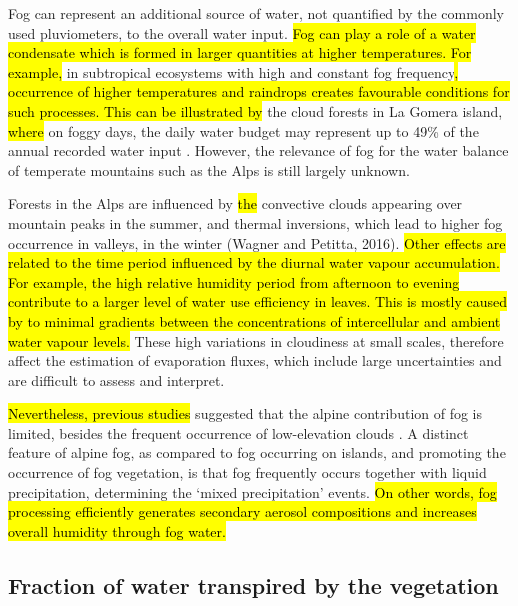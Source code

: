 \documentclass[10pt,letterpaper]{article}
\begin{document}
Fog can represent an additional source of water, not quantified by the commonly used pluviometers, to the overall water input. \hl{Fog can play a role of a water condensate which is formed in larger quantities at higher temperatures. For example, }in subtropical ecosystems with high and constant fog frequency\hl{, occurrence of higher temperatures and raindrops creates favourable conditions for such processes. This can be illustrated by }the cloud forests in La Gomera island, \hl{where }on foggy days, the daily water budget may represent up to 49\% of the annual recorded water input \cite{e16b77c7c83b4b92b69d38a25a041d1a,GARCIASANTOS20091565,SantosBruijnzeel2011}. However, the relevance of fog for the water balance of temperate mountains such as the Alps is still largely unknown. 

Forests in the Alps are influenced by \hl{the} convective clouds appearing over mountain peaks in the summer, and thermal inversions, which lead to higher fog occurrence in valleys, in the winter (Wagner and Petitta, 2016). \hl{Other effects are related to the time period influenced by the diurnal water vapour accumulation. For example, the high relative humidity period from afternoon to evening contribute to a larger level of water use efficiency in leaves. This is mostly caused by to minimal gradients between the concentrations of intercellular and ambient water vapour levels. }These high variations in cloudiness at small scales, therefore affect the estimation of evaporation fluxes, which include large uncertainties and are difficult to assess and interpret. 

\hl{Nevertheless, previous studies} suggested that the alpine contribution of fog is limited, besides the frequent occurrence of low-elevation clouds \cite{EUGSTER2006288}. A distinct feature of alpine fog, as compared to fog occurring on islands, and promoting the occurrence of fog vegetation, is that fog frequently occurs together with liquid precipitation, determining the ‘mixed precipitation’ events. \hl{On other words, fog processing efficiently generates secondary aerosol compositions and increases overall humidity through fog water.}

\subsection{Fraction of water transpired by the vegetation}
\end{document}
